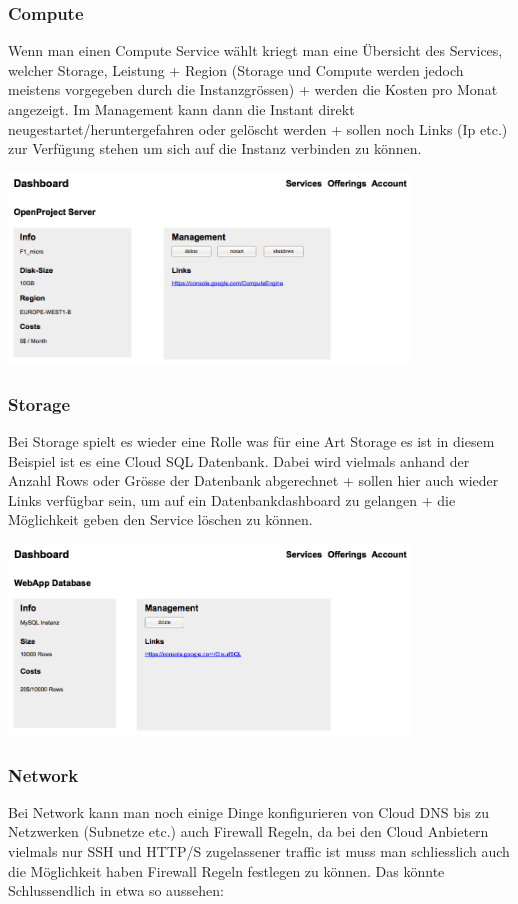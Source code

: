 \subsubsection{Compute}
Wenn man einen Compute Service wählt kriegt man eine Übersicht des Services, 
welcher Storage, Leistung + Region (Storage und Compute werden jedoch 
meistens vorgegeben durch die Instanzgrössen) + werden die Kosten pro 
Monat angezeigt.
Im Management kann dann die Instant direkt neugestartet/heruntergefahren oder gelöscht 
werden + sollen noch Links (Ip etc.) zur Verfügung stehen um sich auf die Instanz 
 verbinden zu können.

\includegraphics[width=0.8\textwidth]{./03_Analyse/03_Dashboard/images/service_info_compute}

\subsubsection{Storage}
Bei Storage spielt es wieder eine Rolle was für eine Art Storage es ist in 
diesem Beispiel ist es eine Cloud SQL Datenbank.
Dabei wird vielmals anhand der Anzahl Rows oder Grösse der Datenbank abgerechnet 
+ sollen hier auch wieder Links verfügbar sein, um auf ein Datenbankdashboard zu 
gelangen + die Möglichkeit geben den Service löschen zu können.

\includegraphics[width=0.8\textwidth]{./03_Analyse/03_Dashboard/images/service_info_storage}


\subsubsection{Network}
Bei Network kann man noch einige Dinge konfigurieren von Cloud DNS bis zu 
Netzwerken (Subnetze etc.) auch Firewall Regeln, da bei den Cloud Anbietern 
vielmals nur SSH und HTTP/S zugelassener traffic ist muss man schliesslich auch 
die Möglichkeit haben Firewall Regeln festlegen zu können.
Das könnte Schlussendlich in etwa so aussehen:

